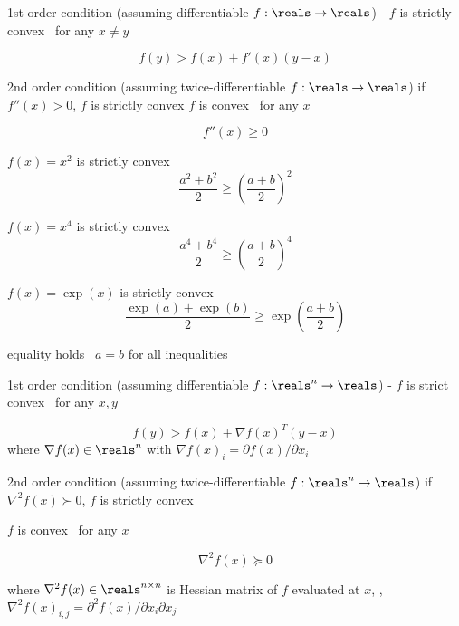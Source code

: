 \documentclass[17pt,landscape]{foils}
\begin{document}
{

\bit
	\item 1st order condition (assuming differentiable $f:\reals\to\reals$)
		- $f$ is strictly convex \iaoi\ for any $x\neq y$%

	\[
		f(y) > f(x) + f'(x)(y-x)
	\]

	\vitem 2nd order condition (assuming twice-differentiable $f:\reals\to\reals$)%
	\bit
		\vitem if $f''(x)>0$, $f$ is strictly convex
		\vitem $f$ is convex \iaoi\ for any $x$

			\[
				f''(x) \geq 0
			\]
	\eit
\eit
\vfill



\bit
	\item $f(x)=x^2$ is strictly convex
	\[
		\frac{a^2 + b^2}{2}
		\geq
		\left(\frac{a+b}{2}\right)^2
	\]

	\vitem $f(x)=x^4$ is strictly convex
	\[
		\frac{a^4 + b^4}{2}
		\geq
		\left(\frac{a+b}{2}\right)^4
	\]

	\vitem $f(x)=\exp(x)$ is strictly convex
	\[
		\frac{\exp(a) + \exp(b)}{2}
		\geq
		\exp\left(\frac{a+b}{2}\right)
	\]

	\vvitem equality holds \iaoi\ $a=b$ for all inequalities
\eit



\bit
\vitem
	1st order condition (assuming differentiable $f:\reals^n\to\reals$)
		- $f$ is strict convex \iaoi\ for any $x,y$%

	\[
		f(y) > f(x) + \nabla f(x)^T (y-x)
	\]
	where $\nabla f(x) \in\reals^{n}$ with $\nabla f(x)_{i} = \partial f(x) / \partial x_i$

\vitem
	2nd order condition (assuming twice-differentiable $f:\reals^n\to\reals$)%
	\bit
	\vitem
		if $\nabla^2 f(x) \succ 0$, $f$ is strictly convex

	\vitem
		$f$ is convex \iaoi\ for any $x$

			\[
				\nabla^2 f(x)\succeq 0
			\]
	\eit

	where $\nabla^2 f(x) \in\reals^{n\times n}$
	is Hessian matrix of $f$ evaluated at $x$,
	\ie,
	$\nabla^2 f(x)_{i,j} = \partial^2 f(x) / \partial x_i \partial x_j$
\eit
\vfill


}
\end{document}
